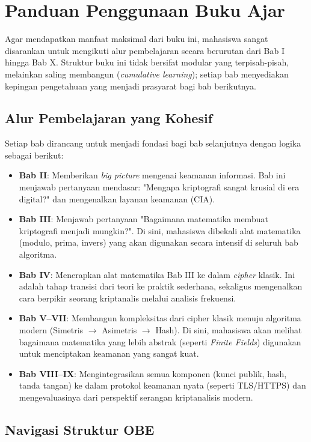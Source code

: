 \section{Panduan Penggunaan Buku Ajar}

Agar mendapatkan manfaat maksimal dari buku ini, mahasiswa sangat disarankan untuk mengikuti alur pembelajaran secara berurutan dari Bab I hingga Bab X. Struktur buku ini tidak bersifat modular yang terpisah-pisah, melainkan saling membangun (\textit{cumulative learning}); setiap bab menyediakan kepingan pengetahuan yang menjadi prasyarat bagi bab berikutnya.

\subsection{Alur Pembelajaran yang Kohesif}

Setiap bab dirancang untuk menjadi fondasi bagi bab selanjutnya dengan logika sebagai berikut:
\begin{itemize}
  \item \textbf{Bab II}: Memberikan \textit{big picture} mengenai keamanan informasi. Bab ini menjawab pertanyaan mendasar: "Mengapa kriptografi sangat krusial di era digital?" dan mengenalkan layanan keamanan (CIA).
  \item \textbf{Bab III}: Menjawab pertanyaan "Bagaimana matematika membuat kriptografi menjadi mungkin?". Di sini, mahasiswa dibekali alat matematika (modulo, prima, invers) yang akan digunakan secara intensif di seluruh bab algoritma.
  \item \textbf{Bab IV}: Menerapkan alat matematika Bab III ke dalam \textit{cipher} klasik. Ini adalah tahap transisi dari teori ke praktik sederhana, sekaligus mengenalkan cara berpikir seorang kriptanalis melalui analisis frekuensi.
  \item \textbf{Bab V--VII}: Membangun kompleksitas dari cipher klasik menuju algoritma modern (Simetris $\to$ Asimetris $\to$ Hash). Di sini, mahasiswa akan melihat bagaimana matematika yang lebih abstrak (seperti \textit{Finite Fields}) digunakan untuk menciptakan keamanan yang sangat kuat.
  \item \textbf{Bab VIII--IX}: Mengintegrasikan semua komponen (kunci publik, hash, tanda tangan) ke dalam protokol keamanan nyata (seperti TLS/HTTPS) dan mengevaluasinya dari perspektif serangan kriptanalisis modern.
\end{itemize}

\subsection{Navigasi Struktur OBE}

